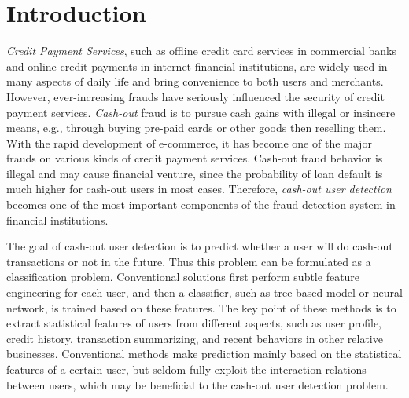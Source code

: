 \section{Introduction}
\emph{Credit Payment Services}, such as offline credit card services in commercial banks and online credit payments in internet financial institutions, are widely used in many aspects of daily life and bring convenience to both users and merchants. However, ever-increasing frauds have seriously influenced the security of credit payment services.  
\emph{Cash-out} fraud is to pursue cash gains with illegal or insincere means, e.g., through buying pre-paid cards or other goods then reselling them. 
With the rapid development of e-commerce, it has become one of the major frauds on various kinds of credit payment services. 
Cash-out fraud behavior is illegal and may cause financial venture, since the probability of loan default is much higher for cash-out users in most cases. 
Therefore, \emph{cash-out user detection} becomes one of the most important components of the fraud detection system in financial institutions.

The goal of cash-out user detection is to predict whether a user will do cash-out transactions or not in the future.
Thus this problem can be formulated as a classification problem.
Conventional solutions first perform subtle feature engineering for each user, and then a classifier, such as tree-based model or neural network, is trained based on these features.
The key point of these methods is to extract statistical features of users from different aspects, such as user profile, credit history, transaction summarizing, and recent behaviors in other relative businesses.
Conventional methods make prediction mainly based on the statistical features of a certain user, but seldom fully exploit the interaction relations between users, which may be beneficial to the cash-out user detection problem.

